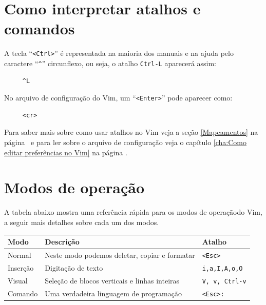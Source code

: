 %
%
%
%
\section{Como interpretar atalhos e comandos}\label{Como interpretar atalhos e comandos}
%
A tecla ``\verb|<Ctrl>|'' é representada na maioria dos manuais e na ajuda
pelo caractere ``\verb|^|'' circunflexo, ou seja, o atalho \verb|Ctrl-L| aparecerá assim:
\begin{verbatim}
     ^L
\end{verbatim} %

No arquivo de configuração do Vim, um ``\verb|<Enter>|'' pode aparecer como:
\begin{verbatim}
     <cr>
\end{verbatim}

Para saber mais sobre como usar atalhos no Vim
veja a seção \ref{Mapeamentos} na página~\pageref{Mapeamentos} e para ler sobre
o arquivo de configuração veja o capítulo \ref{cha:Como editar preferências no
Vim} na página \pageref{cha:Como editar preferências no Vim}.

\section{Modos de operação}\label{Modos de operação}

A tabela abaixo mostra uma referência rápida para os modos de operaçãodo Vim,
a seguir mais detalhes sobre cada um dos modos. \newline

\begin{tabular}{|l|l|l|}
\hline
\textbf{Modo} & \textbf{Descrição} & \textbf{Atalho} \tabularnewline
\hline \hline
Normal\index{modo normal} & Neste modo podemos deletar, copiar e formatar & {\tt <Esc>}\tabularnewline
\hline
Inserção\index{modo de inserção} & Digitação de texto & {}{\tt i,a,I,A,o,O}\tabularnewline
\hline
Visual\index{modo visual} & Seleção de blocos verticais e linhas inteiras & {}{\tt V, v, Ctrl-v} \tabularnewline
\hline
Comando\index{modo de comando} & Uma verdadeira linguagem de programação & {}{\tt <Esc>:}\tabularnewline
\hline
\end{tabular}


